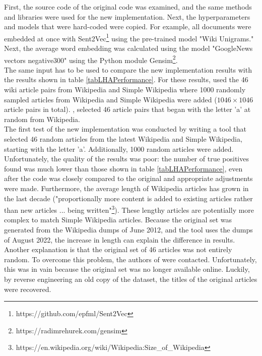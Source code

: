 First, the source code of the original code was examined, and the same methods and libraries were used for the new implementation. Next, the hyperparameters and models that were hard-coded were copied. For example, all documents were embedded at once with Sent2Vec\footnote{https://github.com/epfml/Sent2Vec} using the pre-trained model "Wiki Unigrams." Next, the average word embedding was calculated using the model "GoogleNews vectors negative300" using the Python module Gensim\footnote{https://radimrehurek.com/gensim}.\\

The same input has to be used to compare the new implementation results with the results shown in table \ref{tabLHAPerformance}. For these results, \citet{nikolov2018large} used the 46 wiki article pairs from Wikipedia and Simple Wikipedia \citep{hwang2015} where 1000 randomly sampled articles from Wikipedia and Simple Wikipedia were added ($1046 \times 1046$ article pairs in total). \citet{hwang2015}, selected 46 article pairs that began with the letter 'a' at random from Wikipedia.\\

The first test of the new implementation was conducted by writing a tool that selected 46 random articles from the latest Wikipedia and Simple Wikipedia, starting with the letter 'a'. Additionally, 1000 random articles were added. Unfortunately, the quality of the results was poor: the number of true positives found was much lower than those shown in table \ref{tabLHAPerformance}, even after the code was closely compared to the original and appropriate adjustments were made. Furthermore, the average length of Wikipedia articles has grown in the last decade ("proportionally more content is added to existing articles rather than new articles ... being written"\footnote{https://en.wikipedia.org/wiki/Wikipedia:Size\_of\_Wikipedia}). These lengthy articles are potentially more complex to match Simple Wikipedia articles. Because the original set was generated from the Wikipedia dumps of June 2012, and the tool uses the dumps of August 2022, the increase in length can explain the difference in results. Another explanation is that the original set of 46 articles was not entirely random. To overcome this problem, the authors of \citep{hwang2015} were contacted. Unfortunately, this was in vain because the original set was no longer available online. Luckily, by reverse engineering an old copy of the dataset, the titles of the original articles were recovered. \\

